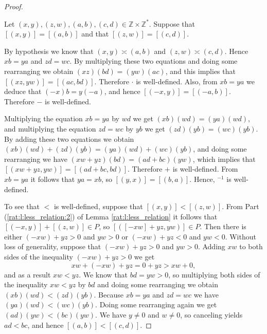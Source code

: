 \begin{proof}
	\begin{notmine}
		Let $(x, y), (z, w), (a, b), (c, d) \in \mathbb{Z} \times \mathbb{Z}^{*}$. Suppose that $[(x, y)] = [(a, b)]$ and that $[(z, w)] = [(c, d)]$.

		By hypothesis we know that $(x, y) \asymp (a, b)$ and $(z, w) \asymp (c, d)$. Hence $x b = y a$ and $z d = w c$. By multiplying these two equations and doing some rearranging we obtain $(x z)(b d) = (y w)(a c)$, and this implies that $[(x z, y w)] = [(a c, b d)]$. Therefore $\cdot$ is well-defined. Also, from $x b = y a$ we deduce that $(-x)b = y(-a)$, and hence $[(-x, y)] = [(-a, b)]$. Therefore $-$ is well-defined.
	\end{notmine}

	Multiplying the equation $x b = y a$ by $w d$ we get $(x b)(w d) = (y a)(w d)$, and multiplying the equation $z d = w c$ by $y b$ we get $(z d)(y b) = (w c)(y b)$. By adding these two equations we obtain $(x b)(w d) + (z d)(y b) = (y a)(w d) + (w c)(y b)$, and doing some rearranging we have $(x w + y z)(b d) = (a d + b c)(y w)$, which implies that $[(x w + yz, y w)] = [(a d + b c, b d)]$. Therefore $+$ is well-defined. From $x b = y a$ it follows that $y a = x b$, so $[(y, x)] = [(b, a)]$. Hence, $^{-1}$ is well-defined.

	To see that $<$ is well-defined, suppose that $[(x, y)] < [(z, w)]$. From Part (\ref{rat:l:less_relation:2}) of Lemma \ref{rat:l:less_relation} it follows that $[(-x, y)] + [(z, w)] \in P$, so $[([-x w] + y z, y w)] \in P$. Then there is either $(-x w) + y z > 0$ and $y w > 0$ or $(-x w) + y z < 0$ and $y w < 0$. Without loss of generality, suppose that $(-x w) + y z > 0$ and $y w > 0$. Adding $x w$ to both sides of the inequality $(-x w) + y z > 0$ we get
	$$
		x w + (-x w) + y z = 0 + y z > x w + 0,
	$$
	and as a result ${x w < y z}$. We know that $b d = y w > 0$, so multiplying both sides of the inequality ${x w < y z}$ by $b d$ and doing some rearranging we obtain ${(x b)(w d) < (z d)(y b)}$. Because $x b = y a$ and $z d = w c$ we have ${(y a)(w d) < (w c)(y b)}$. Doing some rearranging again we get $(a d)(y w) < (b c)(y w)$. We have $y \not= 0$ and $w \not= 0$, so canceling yields $a d < b c$, and hence $[(a, b)] < [(c, d)]$.
\end{proof}


\Newpage
\ratLessRelL*

